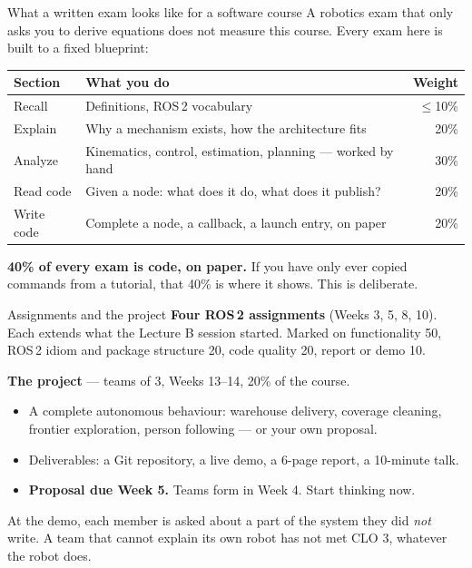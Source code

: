 \documentclass[aspectratio=169]{beamer}
\begin{document}
\begin{frame}{What a written exam looks like for a software course}
  \small
  A robotics exam that only asks you to derive equations does not measure this course.
  Every exam here is built to a fixed blueprint:

  \vspace{0.5em}
  \begin{center}
  \begin{tabular}{@{}llr@{}}
    \toprule
    \textbf{Section} & \textbf{What you do} & \textbf{Weight} \\
    \midrule
    Recall     & Definitions, ROS\,2 vocabulary & $\le$10\% \\
    Explain    & Why a mechanism exists, how the architecture fits & 20\% \\
    Analyze    & Kinematics, control, estimation, planning --- worked by hand & 30\% \\
    Read code  & Given a node: what does it do, what does it publish? & 20\% \\
    Write code & Complete a node, a callback, a launch entry, on paper & 20\% \\
    \bottomrule
  \end{tabular}
  \end{center}

  \vspace{0.7em}
  \textbf{40\% of every exam is code, on paper.} If you have only ever copied commands from a
  tutorial, that 40\% is where it shows. This is deliberate.
\end{frame}

\begin{frame}{Assignments and the project}
  \small
  \textbf{Four ROS\,2 assignments} (Weeks 3, 5, 8, 10). Each extends what the Lecture B
  session started. Marked on functionality 50, ROS\,2 idiom and package structure 20,
  code quality 20, report or demo 10.

  \vspace{0.7em}
  \textbf{The project} --- teams of 3, Weeks 13--14, 20\% of the course.
  \begin{itemize}\footnotesize
    \item A complete autonomous behaviour: warehouse delivery, coverage cleaning, frontier
          exploration, person following --- or your own proposal.
    \item Deliverables: a Git repository, a live demo, a 6-page report, a 10-minute talk.
    \item \textbf{Proposal due Week 5.} Teams form in Week 4. Start thinking now.
  \end{itemize}

  \vspace{0.5em}
  \begin{underhood}
    \footnotesize
    At the demo, each member is asked about a part of the system they did \emph{not} write.
    A team that cannot explain its own robot has not met CLO 3, whatever the robot does.
  \end{underhood}
\end{frame}
\end{document}
